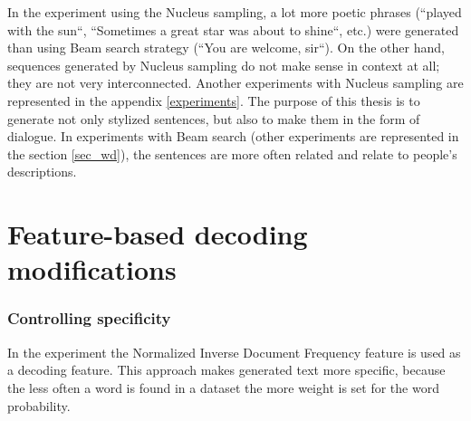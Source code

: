 In the experiment using the Nucleus sampling, a lot more poetic phrases (``played with the sun``, ``Sometimes a great star was about to shine``, etc.) were generated than using Beam search strategy (``You are welcome, sir``). On the other hand, sequences generated by Nucleus sampling do not make sense in context at all; they are not very interconnected. Another experiments with Nucleus sampling are represented in the appendix \ref{experiments}. The purpose of this thesis is to generate not only stylized sentences, but also to make them in the form of dialogue. In experiments with Beam search (other experiments are represented in the section \ref{sec_wd}), the sentences are more often related and relate to people’s descriptions.

\section{Feature-based decoding modifications}
\subsubsection{Controlling specificity}

In the experiment the Normalized Inverse Document Frequency feature is used as a decoding feature. This approach makes generated text more specific, because the less often a word is found in a dataset the more weight is set for the word probability. 

